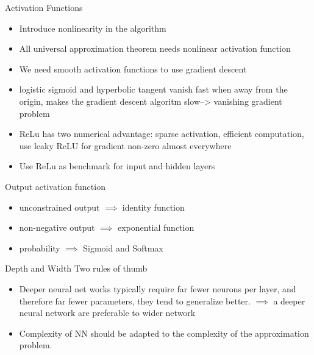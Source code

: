\documentclass[aspectratio=169]{beamer} %
\begin{document}
\begin{frame}{Activation Functions}
\begin{itemize}
    \item Introduce nonlinearity in the algorithm 
    \item All universal approximation theorem needs nonlinear activation function
    \item We need smooth activation functions to use gradient descent
    \item logistic sigmoid and hyperbolic tangent vanish fast when away from the origin, makes the gradient descent algoritm slow--> vanishing gradient problem
    \item ReLu has two numerical advantage: sparse activation, efficient computation, use leaky ReLU for gradient non-zero almost everywhere
    \item Use ReLu as benchmark for input and hidden layers
\end{itemize}
    
\end{frame}

\begin{frame}{Output activation function}
    \begin{itemize}
        \item unconstrained output $\implies$ identity function
        \item non-negative output $\implies$ exponential function
        \item probability $\implies $ Sigmoid and Softmax
    \end{itemize}
\end{frame}

\begin{frame}{Depth and Width}
Two rules of thumb
\begin{itemize}
    \item Deeper neural net works typically require far fewer neurons per layer, and therefore far fewer parameters, they tend to generalize better. 
    $\implies$
    a deeper neural network are preferable to wider network
    \item Complexity of NN should be adapted to the complexity of the approximation problem.
\end{itemize}
    
\end{frame}
\end{document}

